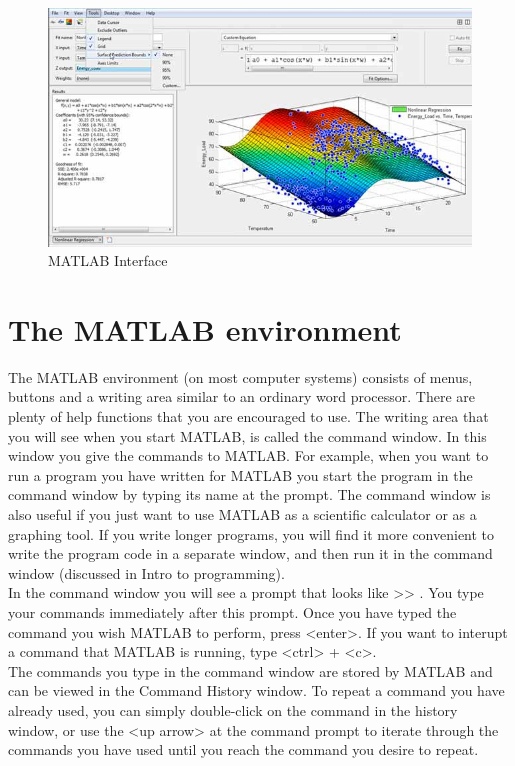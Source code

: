 \documentclass[twoside,a4paper,16pt]{book}
\begin{document}
{ \begin{figure}[ht!]
 	\begin{center}
 		\includegraphics[width=13.0cm]{4.jpg}
 		\caption{MATLAB Interface}
 	\end{center}
 \end{figure}
 \section*{The MATLAB environment} 
 The MATLAB environment (on most computer systems) consists of menus, buttons and a writing area similar to an ordinary word processor. There are plenty of help functions that you are encouraged to use. The writing area that you will see when you start MATLAB, is called the command window. In this window you give the commands to MATLAB. For example, when you want to run a program you have written for MATLAB you start the program in the command window by typing its name at the prompt. The command window is also useful if you just want to use MATLAB as a scientific calculator or as a graphing tool. If you write longer programs, you will find it more convenient to write the program code in a separate window, and then run it in the command window (discussed in Intro to programming).\\
 
 In the command window you will see a prompt that looks like >> . You type your commands immediately after this prompt. Once you have typed the command you wish MATLAB to perform, press <enter>. If you want to interupt a command that MATLAB is running, type <ctrl> + <c>.\\
 
 The commands you type in the command window are stored by MATLAB and can be viewed in the Command History window. To repeat a command you have already used, you can simply double-click on the command in the history window, or use the <up arrow> at the command prompt to iterate through the commands you have used until you reach the command you desire to repeat.\\
}
\end{document}
